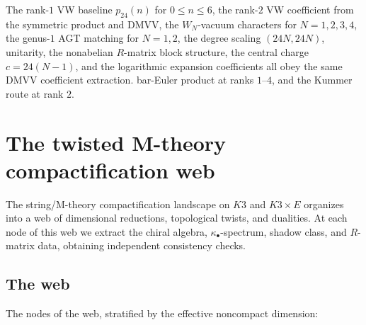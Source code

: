 The rank-$1$ VW baseline \(p_{24}(n)\) for \(0\leq n\leq6\), the
rank-$2$ VW coefficient from the symmetric product and DMVV, the
\(W_N\)-vacuum characters for \(N=1,2,3,4\), the genus-$1$ AGT
matching for \(N=1,2\), the degree scaling \((24N,24N)\), unitarity,
the nonabelian \(R\)-matrix block structure, the central charge
\(c=24(N-1)\), and the logarithmic expansion coefficients
all obey the same DMVV coefficient extraction.
bar-Euler product at ranks $1$--$4$, and the Kummer route at rank $2$.

\section{The twisted M-theory compactification web}
\label{sec:twisted-m-theory-web}

The string/M-theory compactification landscape on $K3$ and $K3 \times E$
organizes into a web of dimensional reductions, topological twists, and
dualities. At each node of this web we extract the chiral algebra,
$\kappa_\bullet$-spectrum, shadow class, and $R$-matrix data, obtaining
independent consistency checks.

\subsection{The web}
\label{sec:compactification-web}

The nodes of the web, stratified by the effective noncompact dimension:

